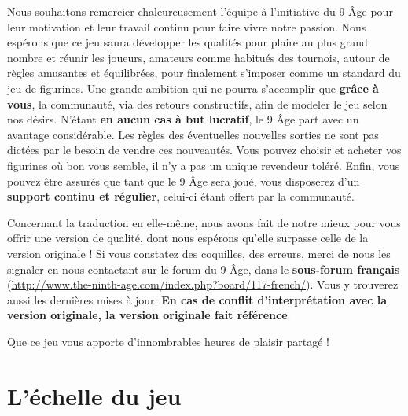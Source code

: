 Nous souhaitons remercier chaleureusement l'équipe à l'initiative du 9\ieme{} Âge pour leur motivation et leur travail continu pour faire vivre notre passion. Nous espérons que ce jeu saura développer les qualités pour plaire au plus grand nombre et réunir les joueurs, amateurs comme habitués des tournois, autour de règles amusantes et équilibrées, pour finalement s'imposer comme un standard du jeu de figurines. Une grande ambition qui ne pourra s'accomplir que \textbf{grâce à vous}, la communauté, via des retours constructifs, afin de modeler le jeu selon nos désirs. N'étant \textbf{en aucun cas à but lucratif}, le 9\ieme{} Âge part avec un avantage considérable. Les règles des éventuelles nouvelles sorties ne sont pas dictées par le besoin de vendre ces nouveautés. Vous pouvez choisir et acheter vos figurines où bon vous semble, il n'y a pas un unique revendeur toléré. Enfin, vous pouvez être assurés que tant que le 9\ieme{} Âge sera joué, vous disposerez d'un \textbf{support continu et régulier}, celui-ci étant offert par la communauté.

Concernant la traduction en elle-même, nous avons fait de notre mieux pour vous offrir une version de qualité, dont nous espérons qu'elle surpasse celle de la version originale ! Si vous constatez des coquilles, des erreurs, merci de nous les signaler en nous contactant sur le forum du 9\ieme{} Âge, dans le \textbf{sous-forum français} (\url{http://www.the-ninth-age.com/index.php?board/117-french/}). Vous y trouverez aussi les dernières mises à jour. \textbf{En cas de conflit d'interprétation avec la version originale, la version originale fait référence}.

Que ce jeu vous apporte d'innombrables heures de plaisir partagé !

\vspace*{0.5cm}

\vfill
\noindent {}


\newpage
\section{L'échelle du jeu}

